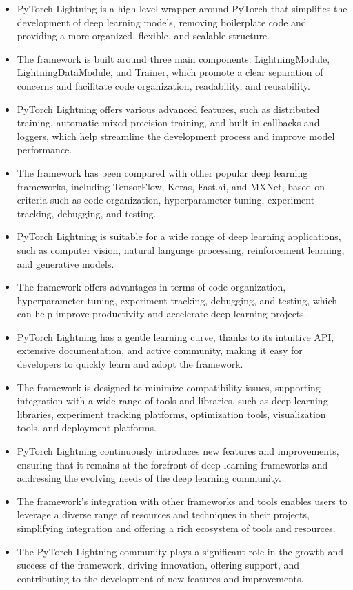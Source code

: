 \documentclass[12pt]{article}
\begin{document}
\begin{itemize}
    \item PyTorch Lightning is a high-level wrapper around PyTorch that simplifies the development of deep learning models, removing boilerplate code and providing a more organized, flexible, and scalable structure.
    \item The framework is built around three main components: LightningModule, LightningDataModule, and Trainer, which promote a clear separation of concerns and facilitate code organization, readability, and reusability.
    \item PyTorch Lightning offers various advanced features, such as distributed training, automatic mixed-precision training, and built-in callbacks and loggers, which help streamline the development process and improve model performance.
    \item The framework has been compared with other popular deep learning frameworks, including TensorFlow, Keras, Fast.ai, and MXNet, based on criteria such as code organization, hyperparameter tuning, experiment tracking, debugging, and testing.
    \item PyTorch Lightning is suitable for a wide range of deep learning applications, such as computer vision, natural language processing, reinforcement learning, and generative models.
    \item The framework offers advantages in terms of code organization, hyperparameter tuning, experiment tracking, debugging, and testing, which can help improve productivity and accelerate deep learning projects.
    \item PyTorch Lightning has a gentle learning curve, thanks to its intuitive API, extensive documentation, and active community, making it easy for developers to quickly learn and adopt the framework.
    \item The framework is designed to minimize compatibility issues, supporting integration with a wide range of tools and libraries, such as deep learning libraries, experiment tracking platforms, optimization tools, visualization tools, and deployment platforms.
    \item PyTorch Lightning continuously introduces new features and improvements, ensuring that it remains at the forefront of deep learning frameworks and addressing the evolving needs of the deep learning community.
    \item The framework's integration with other frameworks and tools enables users to leverage a diverse range of resources and techniques in their projects, simplifying integration and offering a rich ecosystem of tools and resources.
    \item The PyTorch Lightning community plays a significant role in the growth and success of the framework, driving innovation, offering support, and contributing to the development of new features and improvements.
\end{itemize}
\end{document}
